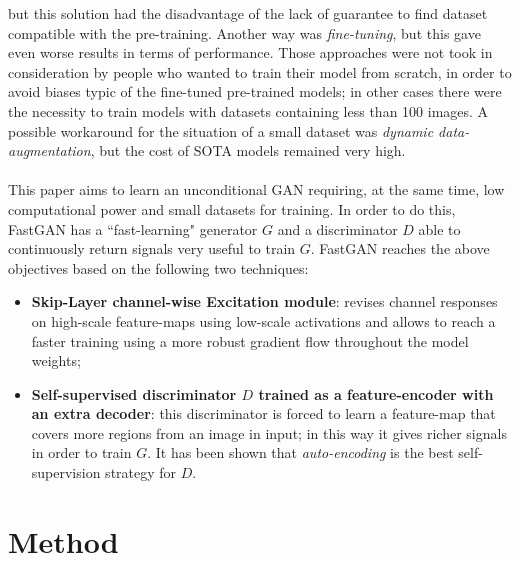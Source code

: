 \documentclass[12pt]{article}
\begin{document}
but this solution had the disadvantage of the lack of guarantee to find dataset compatible with the pre-training. 
Another way was \textit{fine-tuning}, but this gave even worse results in terms of performance.
Those approaches were not took in consideration by people who wanted to train their model from scratch, in order to 
avoid biases typic of the fine-tuned pre-trained models; in other cases there were the necessity to train models
with datasets containing less than 100 images.
A possible workaround for the situation of a small dataset was \textit{dynamic data-augmentation}, but the cost of SOTA models
remained very high.\\\\
This paper aims to learn an unconditional GAN requiring, at the same time, low computational power and small datasets
for training. In order to do this, FastGAN has a ``fast-learning" generator $G$ and a discriminator $D$ able to continuously
return signals very useful to train $G$. FastGAN reaches the above objectives based on the following two techniques:
\begin{itemize}
	\setlength\itemsep{0.01em}
	\item \textbf{Skip-Layer channel-wise Excitation module}: revises channel responses on high-scale feature-maps using
			low-scale activations and allows to reach a faster training using a more robust gradient flow throughout the 
			model weights;
	\item \textbf{Self-supervised discriminator $D$ trained as a feature-encoder with an extra decoder}: this discriminator
			is forced to learn a feature-map that covers more regions from an image in input; in this way it gives richer
			signals in order to train $G$. It has been shown that \textit{auto-encoding} is the best self-supervision strategy for $D$.
\end{itemize} 


\section{Method}
\large	
\end{document}
